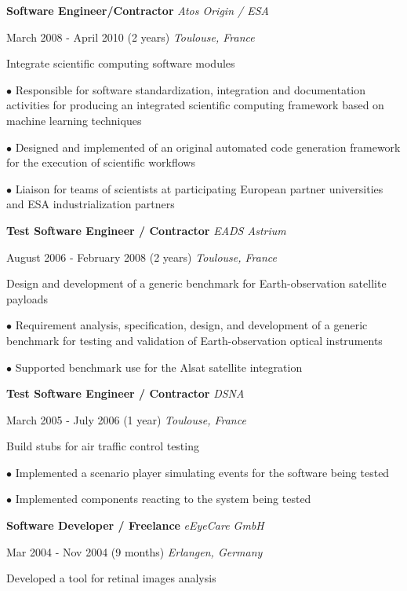 \documentclass[12pt]{article}
\newcommand{\mynewsection}[2]{%
  \medskip

  \textbf{\color{colorsection}\LARGE {#1}\hspace{0.25in}{#2}}
}
\newcommand{\experience}[4]{%
  \medskip
  {\color{colorsection}\textbf{\large #1}}
  \hfill
  \textit{\small #2}

  {\small #3}
  \hfill    
  \textit{\small #4}}
\begin{document}
\begin{minipage}[t]{0.67\linewidth}
  \mynewsection{\faBriefcase}{Experience (cont.)}
  
  \experience{Software Engineer/Contractor}{Atos Origin /
    ESA}{March 2008 - April 2010 (2 years)}{Toulouse, France}

  \medskip

  {\large Integrate scientific computing software modules}

  \medskip

  $\bullet$ Responsible for software standardization, integration and
  documentation activities for producing an integrated scientific
  computing framework based on machine learning techniques

  \medskip
  
  $\bullet$ Designed and implemented of an original automated code
  generation framework for the execution of scientific workflows

  \medskip

  $\bullet$ Liaison for teams of scientists at participating European
  partner universities and ESA industrialization partners

  \bigskip
  
  \experience{Test Software Engineer / Contractor}{%
    EADS Astrium}{%
    August 2006 - February 2008 (2 years)}{%
    Toulouse, France}
  
  \medskip

  {\large Design and development of a generic benchmark for
    Earth-observation satellite payloads}

  \medskip

  $\bullet$ Requirement analysis, specification, design, and
  development of a generic benchmark for testing and validation of
  Earth-observation optical instruments

  \medskip

  $\bullet$ Supported benchmark use for the Alsat satellite
  integration

  \bigskip
  
  \experience{Test Software Engineer / Contractor}{%
    DSNA}{%
    March 2005 - July 2006 (1 year)}{%
    Toulouse, France}

  \medskip
  
  {\large Build stubs for air traffic control testing}

  \medskip

  $\bullet$ Implemented a scenario player simulating events for the
  software being tested

  \medskip

  $\bullet$ Implemented components reacting to the system being tested

  \bigskip
  
  \experience{Software Developer / Freelance}{%
    eEyeCare GmbH}{%
    Mar 2004 - Nov 2004 (9 months)}{%
    Erlangen, Germany}
  
  \medskip

  {\large Developed a tool for retinal images analysis}
  
\end{minipage}
\end{document}
